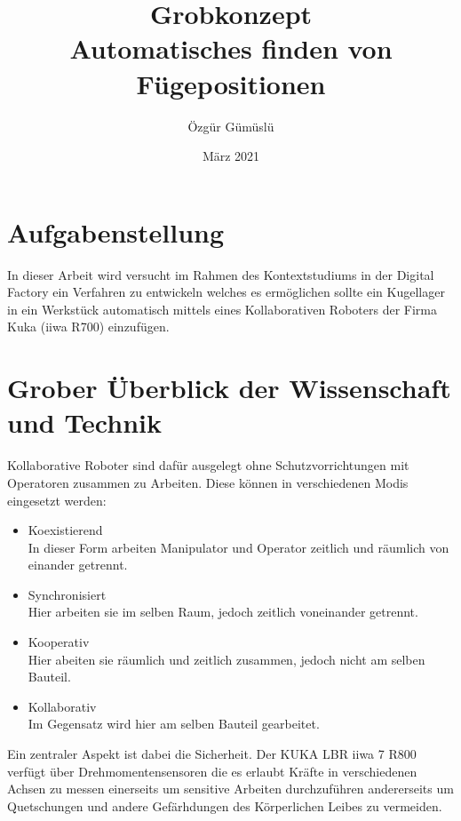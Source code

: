 \documentclass[12pt]{article}
\title{Grobkonzept \\ Automatisches finden von Fügepositionen}
\author{Özgür Gümüslü}
\date{März 2021}
\begin{document}
\maketitle
\tableofcontents
\newpage
\section{Aufgabenstellung}
In dieser Arbeit wird versucht im Rahmen des Kontextstudiums in der Digital Factory ein Verfahren zu
entwickeln welches es ermöglichen sollte ein Kugellager in ein Werkstück automatisch mittels eines
Kollaborativen Roboters der Firma Kuka (iiwa R700) einzufügen.

\section{Grober Überblick der Wissenschaft und Technik}
Kollaborative Roboter sind dafür ausgelegt ohne Schutzvorrichtungen mit Operatoren zusammen zu
Arbeiten. Diese können in verschiedenen Modis eingesetzt werden:

\begin{itemize}
\item Koexistierend \\
In dieser Form arbeiten Manipulator und Operator zeitlich und räumlich von einander getrennt.
 
\item Synchronisiert \\
Hier arbeiten sie im selben Raum, jedoch zeitlich voneinander getrennt.

\item Kooperativ \\
Hier abeiten sie räumlich und zeitlich zusammen, jedoch nicht am selben Bauteil.

\item Kollaborativ \\
Im Gegensatz wird hier am selben Bauteil gearbeitet.
\end{itemize}


Ein zentraler Aspekt ist dabei die Sicherheit. Der KUKA LBR iiwa 7 R800 verfügt über
Drehmomentensensoren die es erlaubt Kräfte in verschiedenen Achsen zu messen einerseits um sensitive
Arbeiten durchzuführen andererseits um Quetschungen und andere Gefärhdungen des Körperlichen Leibes
zu vermeiden.
\newpage
\end{document}
